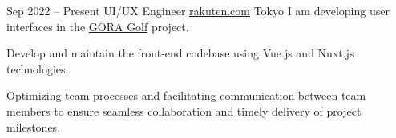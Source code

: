 \cventry
  {Sep 2022 – Present}
  {UI/UX Engineer}
  {\href{https://global.rakuten.com/corp/}{rakuten.com}}
  {Tokyo}
  {}
  {I am developing user interfaces in the \href{https://gora.golf.rakuten.co.jp/}{GORA Golf} project.}

\cvlistitem
  {Develop and maintain the front-end codebase using Vue.js and Nuxt.js technologies.}

\cvlistitem
  {Optimizing team processes and facilitating communication between team members to ensure seamless collaboration and timely delivery of project milestones.}
